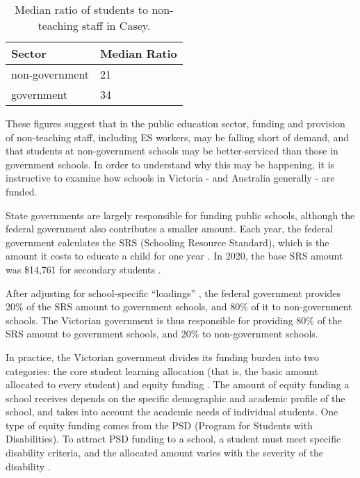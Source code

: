 \documentclass[11pt, a4paper]{article}
\begin{document}
    \begin{table}[!ht]
        \centering
        \caption{Median ratio of students to non-teaching staff in Casey.}
        \begin{tabular}{|l|l|}
            \hline
            Sector          & Median Ratio  \\ \hline
            non-government  & 21            \\ \hline
            government      & 34            \\ \hline
        \end{tabular}
        \label{es_staff_ratios}
    \end{table}

    These figures suggest that in the public education sector, funding and provision of non-teaching staff, including ES workers, may be falling short of demand, and that students at non-government schools may be better-serviced than those in government schools. In order to understand why this may be happening, it is instructive to examine how schools in Victoria - and Australia generally - are funded.

    State governments are largely responsible for funding public schools, although the federal government also contributes a smaller amount. Each year, the federal government calculates the SRS (Schooling Resource Standard), which is the amount it costs to educate a child for one year \parencite{srs_background}. In 2020, the base SRS amount was \$14,761 for secondary students \parencite{srs_2020}.

    After adjusting for school-specific ``loadings'' \parencite{srs_2020}, the federal government provides 20\% of the SRS amount to government schools, and 80\% of it to non-government schools. The Victorian government is thus responsible for providing 80\% of the SRS amount to government schools, and 20\% to non-government schools. 

    In practice, the Victorian government divides its funding burden into two categories: the core student learning allocation (that is, the basic amount allocated to every student) and equity funding \parencite{srp_vic}. The amount of equity funding a school receives depends on the specific demographic and academic profile of the school, and takes into account the academic needs of individual students. One type of equity funding comes from the PSD (Program for Students with Disabilities). To attract PSD funding to a school, a student must meet specific disability criteria, and the allocated amount varies with the severity of the disability \parencite{psd_guidelines}.
\end{document}
